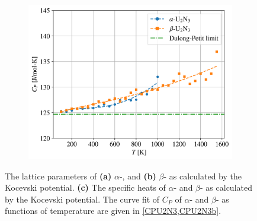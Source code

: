 \documentclass[preprint, 12pt]{elsarticle}
\begin{document}
\begin{figure}[h!]
\begin{subfigure}{0.45\textwidth}
    \includegraphics[width=\textwidth]{U2N3CP.png}
    \caption{}
    \label{Fig:U2N3CP}
\end{subfigure}
\caption{The lattice parameters of \textbf{(a)} $\alpha$-, and \textbf{(b)} $\beta$- as calculated by the Kocevski potential. \textbf{(c)} The specific heats of $\alpha$- and $\beta$- as calculated by the Kocevski potential. The curve fit of $C_P$ of $\alpha$- and $\beta$- as functions of temperature are given in \cref{CPU2N3,CPU2N3b}.}
\label{Fig:U2N3}
\end{figure}





\end{document}
